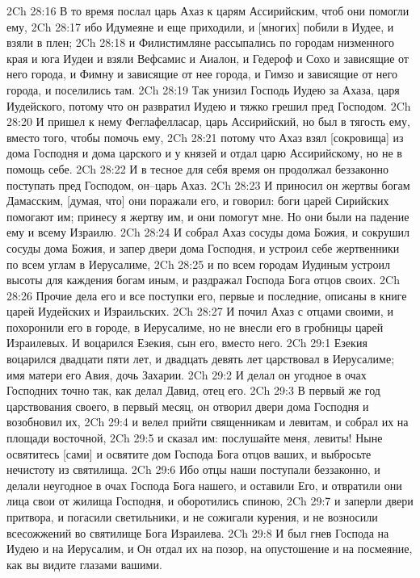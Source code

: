 2Ch 28:16  В то время послал царь Ахаз к царям Ассирийским, чтоб они помогли ему,
2Ch 28:17  ибо Идумеяне и еще приходили, и [многих] побили в Иудее, и взяли в плен;
2Ch 28:18  и Филистимляне рассыпались по городам низменного края и юга Иудеи и взяли Вефсамис и Аиалон, и Гедероф и Сохо и зависящие от него города, и Фимну и зависящие от нее города, и Гимзо и зависящие от него города, и поселились там.
2Ch 28:19  Так унизил Господь Иудею за Ахаза, царя Иудейского, потому что он развратил Иудею и тяжко грешил пред Господом.
2Ch 28:20  И пришел к нему Феглафелласар, царь Ассирийский, но был в тягость ему, вместо того, чтобы помочь ему,
2Ch 28:21  потому что Ахаз взял [сокровища] из дома Господня и дома царского и у князей и отдал царю Ассирийскому, но не в помощь себе.
2Ch 28:22  И в тесное для себя время он продолжал беззаконно поступать пред Господом, он--царь Ахаз.
2Ch 28:23  И приносил он жертвы богам Дамасским, [думая, что] они поражали его, и говорил: боги царей Сирийских помогают им; принесу я жертву им, и они помогут мне. Но они были на падение ему и всему Израилю.
2Ch 28:24  И собрал Ахаз сосуды дома Божия, и сокрушил сосуды дома Божия, и запер двери дома Господня, и устроил себе жертвенники по всем углам в Иерусалиме,
2Ch 28:25  и по всем городам Иудиным устроил высоты для каждения богам иным, и раздражал Господа Бога отцов своих.
2Ch 28:26  Прочие дела его и все поступки его, первые и последние, описаны в книге царей Иудейских и Израильских.
2Ch 28:27  И почил Ахаз с отцами своими, и похоронили его в городе, в Иерусалиме, но не внесли его в гробницы царей Израилевых. И воцарился Езекия, сын его, вместо него.
2Ch 29:1  Езекия воцарился двадцати пяти лет, и двадцать девять лет царствовал в Иерусалиме; имя матери его Авия, дочь Захарии.
2Ch 29:2  И делал он угодное в очах Господних точно так, как делал Давид, отец его.
2Ch 29:3  В первый же год царствования своего, в первый месяц, он отворил двери дома Господня и возобновил их,
2Ch 29:4  и велел прийти священникам и левитам, и собрал их на площади восточной,
2Ch 29:5  и сказал им: послушайте меня, левиты! Ныне освятитесь [сами] и освятите дом Господа Бога отцов ваших, и выбросьте нечистоту из святилища.
2Ch 29:6  Ибо отцы наши поступали беззаконно, и делали неугодное в очах Господа Бога нашего, и оставили Его, и отвратили они лица свои от жилища Господня, и оборотились спиною,
2Ch 29:7  и заперли двери притвора, и погасили светильники, и не сожигали курения, и не возносили всесожжений во святилище Бога Израилева.
2Ch 29:8  И был гнев Господа на Иудею и на Иерусалим, и Он отдал их на позор, на опустошение и на посмеяние, как вы видите глазами вашими.
